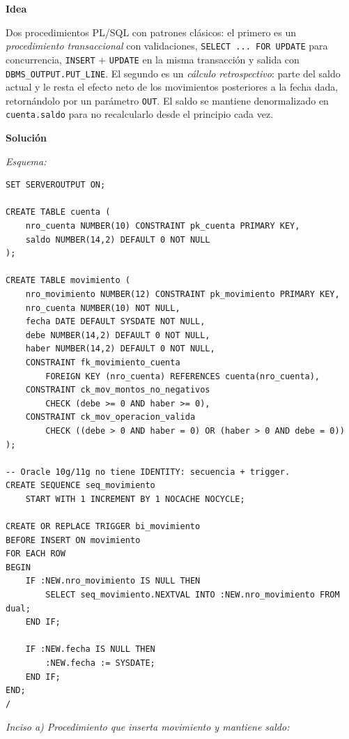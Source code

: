 \documentclass[11pt,a4paper]{article}
\newcommand{\itemcabecera}[1]{\noindent\textbf{#1}\par\medskip}
\newcommand{\bloqueIdea}{\itemcabecera{Idea}}
\newcommand{\bloqueSolucion}{\itemcabecera{Soluci\'on}}
\begin{document}
\bloqueIdea

Dos procedimientos PL/SQL con patrones clásicos: el primero es un \emph{procedimiento transaccional} con validaciones, \texttt{SELECT ... FOR UPDATE} para concurrencia, \texttt{INSERT} + \texttt{UPDATE} en la misma transacción y salida con \texttt{DBMS\_OUTPUT.PUT\_LINE}. El segundo es un \emph{cálculo retrospectivo}: parte del saldo actual y le resta el efecto neto de los movimientos posteriores a la fecha dada, retornándolo por un parámetro \texttt{OUT}. El saldo se mantiene denormalizado en \texttt{cuenta.saldo} para no recalcularlo desde el principio cada vez.

\bloqueSolucion

\textit{Esquema:}

\begin{lstlisting}
SET SERVEROUTPUT ON;

CREATE TABLE cuenta (
    nro_cuenta NUMBER(10) CONSTRAINT pk_cuenta PRIMARY KEY,
    saldo NUMBER(14,2) DEFAULT 0 NOT NULL
);

CREATE TABLE movimiento (
    nro_movimiento NUMBER(12) CONSTRAINT pk_movimiento PRIMARY KEY,
    nro_cuenta NUMBER(10) NOT NULL,
    fecha DATE DEFAULT SYSDATE NOT NULL,
    debe NUMBER(14,2) DEFAULT 0 NOT NULL,
    haber NUMBER(14,2) DEFAULT 0 NOT NULL,
    CONSTRAINT fk_movimiento_cuenta
        FOREIGN KEY (nro_cuenta) REFERENCES cuenta(nro_cuenta),
    CONSTRAINT ck_mov_montos_no_negativos
        CHECK (debe >= 0 AND haber >= 0),
    CONSTRAINT ck_mov_operacion_valida
        CHECK ((debe > 0 AND haber = 0) OR (haber > 0 AND debe = 0))
);

-- Oracle 10g/11g no tiene IDENTITY: secuencia + trigger.
CREATE SEQUENCE seq_movimiento
    START WITH 1 INCREMENT BY 1 NOCACHE NOCYCLE;

CREATE OR REPLACE TRIGGER bi_movimiento
BEFORE INSERT ON movimiento
FOR EACH ROW
BEGIN
    IF :NEW.nro_movimiento IS NULL THEN
        SELECT seq_movimiento.NEXTVAL INTO :NEW.nro_movimiento FROM dual;
    END IF;

    IF :NEW.fecha IS NULL THEN
        :NEW.fecha := SYSDATE;
    END IF;
END;
/
\end{lstlisting}

\textit{Inciso a) Procedimiento que inserta movimiento y mantiene saldo:}
\end{document}

